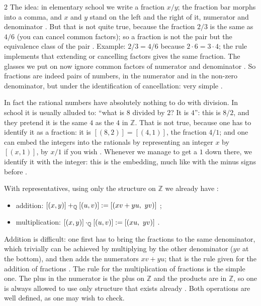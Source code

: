 \begin{paracol}{2}
The idea: in elementary school we write a fraction $x/y$; the fraction bar morphs into a comma, and $x$ and $y$ stand on the left
and the right of it, numerator and denominator . But that is not quite true,
because the fraction $2/3$ is the same as $4/6$ (you can cancel common factors); so a fraction is not the pair but the
equivalence class of the pair . Example: $2/3=4/6$ because $2\cdot6=3\cdot4$; the rule
implements that extending or cancelling factors gives the same fraction. The glasses we put on now ignore common factors of
numerator and denominator . So fractions are indeed pairs of numbers, in
the numerator and in the non-zero denominator, but under the identification of cancellation: very simple
.

In fact the rational numbers have absolutely nothing to do with division. In school it is usually alluded to: ``what is $8$
divided by $2$? It is $4$'': this is $8/2$, and they pretend it is the same $4$ as the $4$ in $\mathbb Z$. That is not true,
because one has to identify it as a fraction: it is $[(8,2)]=[(4,1)]$, the fraction $4/1$; and one can embed the integers into the
rationals by representing an integer $x$ by $[(x,1)]$, by $x/1$ if you wish .
Whenever we manage to get a $1$ down there, we identify it with the integer: this is the embedding, much like with the minus
signs before .

\begin{definition}[Operations on $\Q$]\label{def:cl-opsQ}
With representatives, using only the structure on $\mathbb Z$ we already have :
\begin{itemize}
  \item addition: $[(x,y)]+_{\mathbb{Q}}[(u,v)]:=[(xv+yu,\ yv)]$ ;
  \item multiplication: $[(x,y)]\cdot_{\mathbb{Q}}[(u,v)]:=[(xu,\ yv)]$ .
\end{itemize}
\end{definition}
Addition is difficult: one first has to bring the fractions to the same denominator, which trivially can be achieved by
multiplying by the other denominator ($yv$ at the bottom), and then adds the numerators $xv+yu$; that is the rule given for the
addition of fractions . The rule for the multiplication of fractions is the
simple one. The plus in the numerator is the plus on $\mathbb Z$ and the products are in $\mathbb Z$, so one is always allowed to
use only structure that exists already . Both operations are well defined, as one may wish to
check.


\end{paracol}
